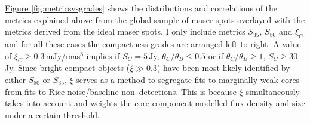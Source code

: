         \hyperref[fig:metricsvsgrades]{Figure \ref*{fig:metricsvsgrades}} shows the distributions and correlations of the metrics explained above from the global sample of maser spots overlayed with the metrics derived from the ideal maser spots. I only include metrics $S_{35}$, $S_{80}$ and $\xi_{C}$ and for all these cases the compactness grades are arranged left to right. A value of $\xi_C\ge0.3$\,mJy/mas$^8$ implies if $S_C=5$\,Jy, $\theta_C/\theta_B\le0.5$ or if $\theta_C/\theta_B\ge1$, $S_C\ge30$\,Jy. Since bright compact objects ($\xi\gg0.3$) have been most likely identified by either $S_{80}$ or $S_{35}$, $\xi$ serves as a method to segregate fits to marginally weak cores from fits to Rice noise/baseline non--detections. This is because $\xi$ simultaneously takes into account and weights the core component modelled flux density and size under a certain threshold.
